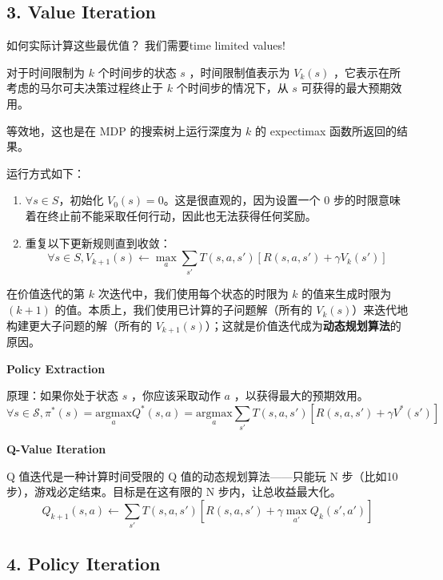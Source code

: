 \documentclass[11pt,a4paper]{article}
\providecommand{\tightlist}{\setlength{\itemsep}{0pt}\setlength{\parskip}{0pt}}
\begin{document}
\subsection{3. Value Iteration}\label{value-iteration}

如何实际计算这些最优值？ 我们需要time limited values!

对于时间限制为 \(k\) 个时间步的状态 \(s\) ，时间限制值表示为 \(V_k(s)\) ，它表示在所考虑的马尔可夫决策过程终止于 \(k\) 个时间步的情况下，从 \(s\) 可获得的最大预期效用。

等效地，这也是在 MDP 的搜索树上运行深度为 \(k\) 的 expectimax 函数所返回的结果。

运行方式如下：

\begin{enumerate}
\def\labelenumi{\arabic{enumi}.}
\tightlist
\item
  \(\forall s \in S\)，初始化 \(V_0(s) = 0\)。这是很直观的，因为设置一个 0 步的时限意味着在终止前不能采取任何行动，因此也无法获得任何奖励。
\item
  重复以下更新规则直到收敛： \[\forall s \in S, V_{k+1}(s) \leftarrow \max_a \sum_{s'} T(s, a, s')[R(s, a, s') + \gamma V_k(s')]\]
\end{enumerate}

在价值迭代的第 \(k\) 次迭代中，我们使用每个状态的时限为 \(k\) 的值来生成时限为 \((k+1)\) 的值。本质上，我们使用已计算的子问题解（所有的 \(V_k(s)\)）来迭代地构建更大子问题的解（所有的 \(V_{k+1}(s)\)）；这就是价值迭代成为\textbf{动态规划算法}的原因。

\textbf{Policy Extraction}

原理：如果你处于状态 \(s\) ，你应该采取动作 \(a\) ，以获得最大的预期效用。 \[
\forall s \in \mathcal{S}, \pi^*(s) = \underset{a}{\text{argmax}} Q^*(s, a) = \underset{a}{\text{argmax}} \sum_{s'} T(s, a, s')[R(s, a, s') + \gamma V^*(s')]
\]

\textbf{Q-Value Iteration}

Q 值迭代是一种计算时间受限的 Q 值的动态规划算法------只能玩 N 步（比如10步），游戏必定结束。目标是在这有限的 N 步内，让总收益最大化。 \[
Q_{k+1}(s, a) \leftarrow \sum_{s'} T(s, a, s')[R(s, a, s') + \gamma \max_{a'} Q_k(s', a')]
\]

\subsection{4. Policy Iteration}\label{policy-iteration}
\end{document}
